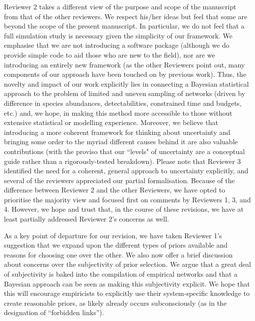 \documentclass[12pt]{letter}
\begin{document}
	Reviewer 2 takes a different view of the purpose and scope of the manuscript from that of the other reviewers. We respect his/her ideas but feel that some are beyond the scope of the present manuscript. In particular, we do not feel that a full simulation study is necessary given the simplicity of our framework. We emphasise that we are not introducing a software package (although we do provide simple code to aid those who are new to the field), nor are we introducing an entirely new framework (as the other Reviewers point out, many components of our approach have been touched on by previous work). Thus, the novelty and impact of our work explicitly lies in connecting a Bayesian statistical approach to the problem of limited and uneven sampling of networks (driven by difference in species abundances, detectabilities, constrained time and budgets, etc.) and, we hope, in making this method more accessible to those without extensive statistical or modelling experience. Moreover, we believe that introducing a more coherent framework for thinking about uncertainty and bringing some order to the myriad different causes behind it are also valuable contributions (with the proviso that our ``levels" of uncertainty are a conceptual guide rather than a rigorously-tested breakdown). Please note that Reviewer 3 identified the need for a coherent, general approach to uncertainty explicitly, and several of the reviewers appreciated our partial formalisation. 
	Because of the difference between Reviewer 2 and the other Reviewers, we have opted to prioritise the majority view and focused first on comments by Reviewers 1, 3, and 4. However, we hope and trust that, in the course of these revisions, we have at least partially addressed Reviewer 2's concerns as well. 


	As a key point of departure for our revision, we have taken Reviewer 1's suggestion that we expand upon the different types of priors available and reasons for choosing one over the other. We also now offer a brief discussion about concerns over the subjectivity of prior selection. We argue that a great deal of subjectivity is baked into the compilation of empirical networks and that a Bayesian approach can be seen as making this subjectivity explicit. We hope that this will encourage empiricists to explicitly use their system-specific knowledge to create reasonable priors, as likely already occurs subconsciously (as in the designation of ``forbidden links''). 
\end{document}
